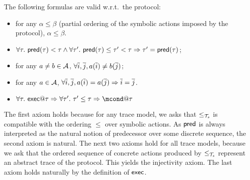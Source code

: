 \begin{proposition}
  The following formulas are valid w.r.t.\ the protocol:
  \begin{itemize}
    \item for any $\alpha \leq \beta$ (partial ordering of the symbolic actions imposed by the protocol), $\alpha \leq \beta$.

    \item
      $\forall \tau.~ \textsf{pred}(\tau)<\tau \wedge
      \forall \tau'.~ \textsf{pred}(\tau)\leq\tau'<\tau \Rightarrow
      \tau'=\textsf{pred}(\tau)$; 
    \item for any $a\neq b\in\mathcal{A}$,
      $\forall \overline{i},\overline{j}, a(\overline{i})\neq b(\overline{j})$; 
    \item for any $a\in\mathcal{A}$,
      $\forall \overline{i},\overline{j}, a(\overline{i})=a(\overline{j}) \Rightarrow \overline{i}=\overline{j}$.
      \item $\forall \tau.~ \mexec@\tau \Rightarrow \forall \tau'.~\tau'\leq \tau \Rightarrow \mcond@\tau$
  \end{itemize}
\end{proposition}


The first axiom holds because for any trace model, we asks that $\leq_{\mathcal{T}_s}$ is compatible with the ordering $\leq$ over symbolic actions.
As $\textsf{pred}$ is always interpreted as the natural notion of predecessor over some discrete sequence, the second axiom is natural. The next two axioms hold for all trace models, because we ask that the ordered sequence of concrete actions produced by $\leq_{\mathcal{T}_s}$ represent an abstract trace of the protocol. This yields the injectivity axiom. The last axiom holds naturally by the definition of $\textsf{exec}$.

